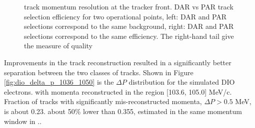 \begin{figure}
\hspace{-0.6in}
\caption{
  \label{fig:dar_vs_par_ann}
  track momentum resolution at the tracker front. 
  DAR vs PAR track selection efficiency for two operational points, left: DAR and PAR selections correspond to the same background, 
  right: DAR and PAR selections correspond to the same efficiency. The right-hand tail give the measure of quality 
}
\end{figure}

Improvements in the track reconstruction resulted in a significantly better separation between the two classes of tracks.
Shown in Figure \ref{fig:dio_delta_p_1036_1050} is the $\Delta{P}$ distribution for the simulated DIO electrons.
with momenta reconstructed in the region [103.6, 105.0] MeV/c.
Fraction of tracks with significantly mis-reconstructed momenta, $\Delta{P} > 0.5$ MeV, is about 0.23.
about 50\% lower than 0.355, estimated in the same momentum window in \cite{MU2E_4595_ANN_TRAINING}..

